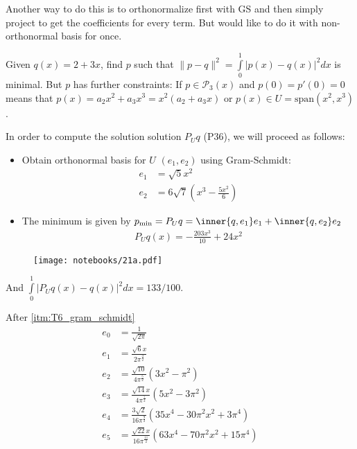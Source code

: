 
Another way to do this is to orthonormalize first with GS and then simply project to get the coefficients for every term. But would like to do it with non-orthonormal basis for once.

\exo{} 
Given $q(x)=2+3x$, find $p$ such that $\|p-q\|^2 = \int\limits_0^1|p(x)-q(x)|^2 dx$ is minimal. But $p$ has further constraints: If $p\in \mathcal{P}_3(x)$ and $p(0)=p'(0)=0$ means that $p(x)=a_2x^2+a_3x^3 = x^2(a_2+a_3x)$ or $p(x)\in U=\mathrm{span}(x^2, x^3)$.

In order to compute the solution solution $P_Uq$ (P36), we will proceed as follows:
\begin{itemize}
\item Obtain orthonormal basis for $U$ $(e_1, e_2)$ using Gram-Schmidt:
\begin{align*}
e_1 &= \sqrt{5}x^2 \\
e_2 &= 6 \sqrt{7} \left(x^{3} - \frac{5 x^{2}}{6}\right)
\end{align*}

\item The minimum is given by $p_\mathrm{min} = P_Uq = \inner{q,e_1}e_1 + \inner{q,e_2} e_2$
\begin{align*}
 P_Uq(x) = - \frac{203 x^{3}}{10} + 24 x^{2}
\end{align*}
\end{itemize}

\begin{figure}[!ht]
\centering
\texttt{[image: notebooks/21a.pdf]} 
\end{figure}

And $\int\limits_0^1|P_Uq(x)-q(x)|^2 dx = 133/100$.

\exo{}  
After \ref{itm:T6_gram_schmidt}
\begin{align*}
e_0 &= \frac{1}{\sqrt{2\pi}} \\
e_1 &= \frac{\sqrt{6} x}{2 \pi^{\frac{3}{2}}} \\
e_2 &= \frac{\sqrt{10}}{4 \pi^{\frac{5}{2}}} \left(3 x^{2} - \pi^{2}\right) \\
e_3 &= \frac{\sqrt{14} x}{4 \pi^{\frac{7}{2}}} \left(5 x^{2} - 3 \pi^{2}\right) \\
e_4 &= \frac{3 \sqrt{2}}{16 \pi^{\frac{9}{2}}} \left(35 x^{4} - 30 \pi^{2} x^{2} + 3 \pi^{4}\right) \\
e_5 &= \frac{\sqrt{22} x}{16 \pi^{\frac{11}{2}}} \left(63 x^{4} - 70 \pi^{2} x^{2} + 15 \pi^{4}\right) \\
\end{align*}

